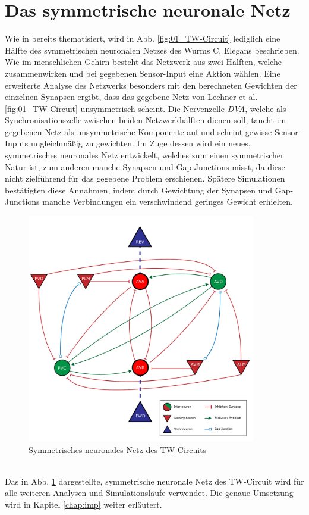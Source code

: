 \section{Das symmetrische neuronale Netz}
\label{sec:my_net}
	Wie in \cite{Wicks1996} bereits thematisiert, wird in Abb. \ref{fig:01_TW-Circuit} lediglich eine Hälfte des symmetrischen neuronalen Netzes des Wurms C. Elegans beschrieben. Wie im menschlichen Gehirn besteht das Netzwerk aus zwei Hälften, welche zusammenwirken und bei gegebenen Sensor-Input eine Aktion wählen. Eine erweiterte Analyse des Netzwerks besonders mit den berechneten Gewichten der einzelnen Synapsen ergibt, dass das gegebene Netz von Lechner et al. \ref{fig:01_TW-Circuit} unsymmetrisch scheint. Die Nervenzelle \textit{DVA}, welche als Synchronisationszelle zwischen beiden Netzwerkhälften dienen soll, taucht im gegebenen Netz als unsymmetrische Komponente auf und scheint gewisse Sensor-Inputs ungleichmäßig zu gewichten. Im Zuge dessen wird ein neues, symmetrisches neuronales Netz entwickelt, welches zum einen symmetrischer Natur ist, zum anderen manche Synapsen und Gap-Junctions misst, da diese nicht zielführend für das gegebene Problem erschienen. Spätere Simulationen bestätigten diese Annahmen, indem durch Gewichtung der Synapsen und Gap-Junctions manche Verbindungen ein verschwindend geringes Gewicht erhielten.
	\begin{figure}[!h] %
		\centering
		\includegraphics[width=10cm]{figures/chap_neuron/Neural_Net_v3_plain.pdf}
		\caption{Symmetrisches neuronales Netz des TW-Circuits}
		\label{fig:nn_new}
	\end{figure}\\
	Das in Abb. \ref{fig:nn_new} dargestellte, symmetrische neuronale Netz des TW-Circuit wird für alle weiteren Analysen und Simulationsläufe verwendet. Die genaue Umsetzung wird in Kapitel \ref{chap:imp} weiter erläutert.
	

